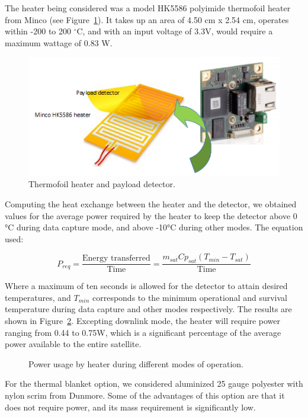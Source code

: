\documentclass[12pt]{article}
\begin{document}
The heater being considered was a model HK5586 polyimide thermofoil heater from Minco (see Figure~\ref{fig:thermal-heater}). It takes up an area of 4.50 cm x 2.54 cm, operates within -200 to 200 $^\circ$C, and with an input voltage of 3.3V, would require a maximum wattage of 0.83 W. 

\begin{figure}[ht]%
\centering
\includegraphics{images/thermal-heater}%
\caption{Thermofoil heater and payload detector.}%
\label{fig:thermal-heater}%
\end{figure}

Computing the heat exchange between the heater and the detector, we obtained values for the average power required by the heater to keep the detector above 0 °C during data capture mode, and above -10°C during other modes. The equation used:

\begin{equation}
P_{req} = \frac{\text{Energy transferred}}{\text{Time}} = \frac{m_{sat} Cp_{sat} (T_{min} - T_{sat})}{\text{Time}}
\label{eq:thermal-power-required}
\end{equation}

Where a maximum of ten seconds is allowed for the detector to attain desired temperatures, and $T_{min}$ corresponds to the minimum operational and survival temperature during data capture and other modes respectively. The results are shown in Figure~\ref{fig:thermal-power-usage}. Excepting downlink mode, the heater will require power ranging from 0.44 to 0.75W, which is a significant percentage of the average power available to the entire satellite.

\begin{figure}[ht]%
\centering
\caption{Power usage by heater during different modes of operation.}%
\label{fig:thermal-power-usage}%
\end{figure}

For the thermal blanket option, we considered aluminized 25 gauge polyester with nylon scrim from Dunmore. Some of the advantages of this option are that it does not require power, and its mass requirement is significantly low.
\end{document}
